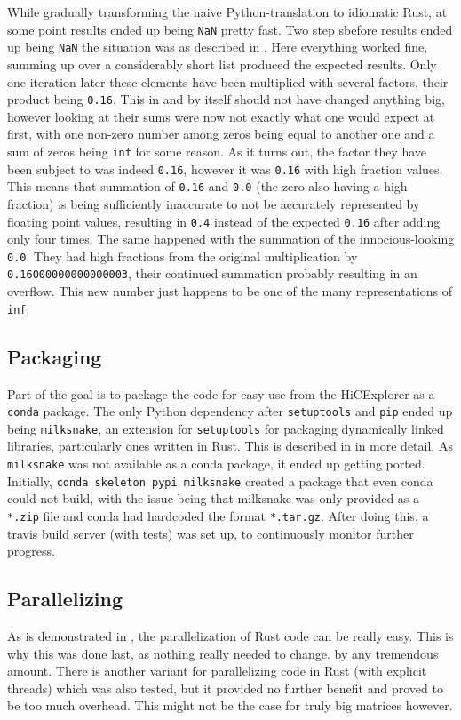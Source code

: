 While gradually transforming the naive Python-translation to idiomatic Rust, at
some point results ended up being \verb|NaN| pretty fast. Two step sbefore
results ended up being \verb|NaN| the situation was as described in
. Here everything worked fine, summing up over a considerably
short list produced the expected results. Only one iteration later these
elements have been multiplied with several factors, their product being
\verb|0.16|. This in and by itself should not have changed anything big,
however looking at  their sums were now not exactly what one
would expect at first, with one non-zero number among zeros being equal to
another one and a sum of zeros being \verb|inf| for some reason. As it turns
out, the factor they have been subject to was indeed \verb|0.16|, however it
was \verb|0.16| with high fraction values. This means that summation of
\verb|0.16| and \verb|0.0| (the zero also having a high fraction) is being
sufficiently inaccurate to not be accurately represented by floating point
values, resulting in \verb|0.4| instead of the expected \verb|0.16| after
adding only four times. The same happened with the summation of the
innocious-looking \verb|0.0|. They had high fractions from the original
multiplication by \verb|0.16000000000000003|, their continued summation
probably resulting in an overflow. This new number just happens to be one of
the many representations of \verb|inf|.


\subsection{Packaging}


Part of the goal is to package the code for easy use from the HiCExplorer as a
\verb|conda| package. The only Python dependency after \verb|setuptools| and
\verb|pip| ended up being \verb|milksnake|, an extension for \verb|setuptools|
for packaging dynamically linked libraries, particularly ones written in Rust.
This is described in  in more detail. As
\verb|milksnake| was not available as a conda package, it ended up getting
ported. Initially, \verb|conda skeleton pypi milksnake| created a package that
even conda could not build, with the issue being that milksnake was only
provided as a \verb|*.zip| file and conda had hardcoded the format
\verb|*.tar.gz|. After doing this, a travis build server (with tests) was set
up, to continuously monitor further progress.


\subsection{Parallelizing}

As is demonstrated in , the parallelization of Rust code can
be really easy. This is why this was done last, as nothing really needed to
change. by any tremendous amount. There is another variant for parallelizing
code in Rust (with explicit threads) which was also tested, but it provided no
further benefit and proved to be too much overhead. This might not be the case
for truly big matrices however.

